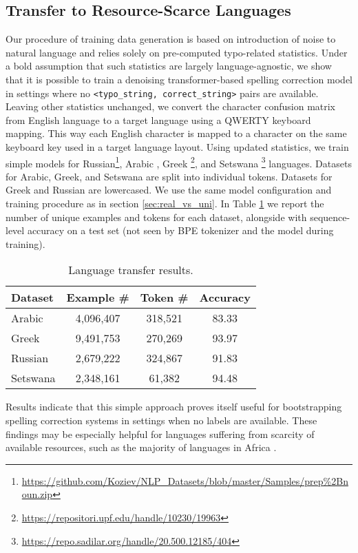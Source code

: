 \documentclass[11pt,a4paper]{article}
\begin{document}
\subsection{Transfer to Resource-Scarce Languages}
Our procedure of training data generation is based on introduction of noise to natural language and relies solely on pre-computed typo-related statistics. Under a bold assumption that such statistics are largely language-agnostic, we show that it is possible to train a denoising transformer-based spelling correction model in settings where no \texttt{<typo\_string, correct\_string>} pairs are available. Leaving other statistics unchanged, we convert the character confusion matrix from English language to a target language using a QWERTY keyboard mapping. This way each English character is mapped to a character on the same keyboard key used in a target language layout. Using updated statistics, we train simple models for Russian\footnote{\url{https://github.com/Koziev/NLP_Datasets/blob/master/Samples/prep\%2Bnoun.zip}}, Arabic \cite{aly-atiya-2013-labr}, Greek \footnote{\url{https://repositori.upf.edu/handle/10230/19963}}, and Setswana \footnote{\url{https://repo.sadilar.org/handle/20.500.12185/404}} languages. Datasets for Arabic, Greek, and Setswana  are split into individual tokens. Datasets for Greek and Russian are lowercased. We use the same model configuration and training procedure as in section \cref{sec:real_vs_uni}. In Table \ref{tab:language_transfer} we report the number of unique examples and tokens for each dataset, alongside with sequence-level accuracy on a test set (not seen by BPE tokenizer and the model during training).

\begin{table}[H]
\centering
\begin{tabular}{lccc}
    \toprule
    Dataset&Example \#&Token \#&Accuracy\\
    \midrule
    Arabic&4,096,407&318,521&83.33\\
    Greek&9,491,753&270,269&93.97\\
    Russian&2,679,222&324,867&91.83\\
    Setswana&2,348,161&61,382&94.48\\
    \bottomrule
\end{tabular}
\caption[Language transfer results.]{Language transfer results.}
\label{tab:language_transfer}
\end{table}

Results indicate that this simple approach proves itself useful for bootstrapping spelling correction systems in settings when no labels are available. These findings may be especially helpful for languages suffering from scarcity of available resources, such as the majority of languages in Africa \cite{martinus2019focus}.
\end{document}
